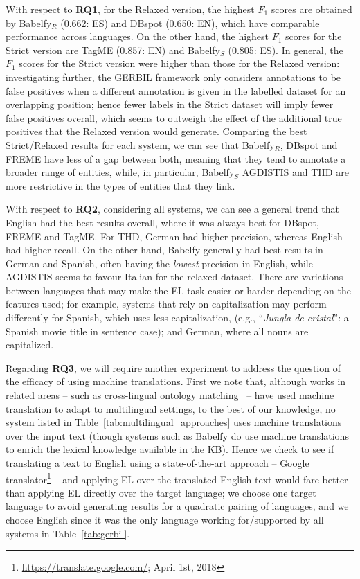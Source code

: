 \documentclass{llncs}
\begin{document}
With respect to \textbf{RQ1}, for the Relaxed version, the highest $F_1$ scores are obtained by Babelfy$_R$ (0.662: ES) and DBspot (0.650: EN), which have comparable performance across languages. On the other hand, the highest $F_1$ scores for the Strict version are TagME (0.857: EN) and Babelfy$_S$ (0.805: ES). In general, the $F_1$ scores for the Strict version were higher than those for the Relaxed version: investigating further, the GERBIL framework only considers annotations to be false positives when a different annotation is given in the labelled dataset for an overlapping position; hence fewer labels in the Strict dataset will imply fewer false positives overall, which seems to outweigh the effect of the additional true positives that the Relaxed version would generate. Comparing the best Strict/Relaxed results for each system, we can see that Babelfy$_R$, DBspot and FREME have less of a gap between both, meaning that they tend to annotate a broader range of entities, while, in particular, Babelfy$_S$ AGDISTIS and THD are more restrictive in the types of entities that they link.

With respect to \textbf{RQ2}, considering all systems, we can see a general trend that English had the best results overall, where it was always best for DBspot, FREME and TagME. For THD, German had higher precision, whereas English had higher recall. On the other hand, Babelfy generally had best results in German and Spanish, often having the \textit{lowest} precision in English, while AGDISTIS seems to favour Italian for the relaxed dataset. There are variations between languages that may make the EL task easier or harder depending on the features used; for example, systems that rely on capitalization may perform differently for Spanish, which uses less capitalization, (e.g., ``\textit{Jungla de cristal}'': a Spanish movie title in sentence case); and German, where all nouns are capitalized.
\medskip

Regarding \textbf{RQ3}, we will require another experiment to address the question of the efficacy of using machine translations. First we note that, although works in related areas -- such as cross-lingual ontology matching~\cite{fu2010} -- have used machine translation to adapt to multilingual settings, to the best of our knowledge, no system listed in Table~\ref{tab:multilingual_approaches} uses machine translations over the input text (though systems such as Babelfy do use machine translations to enrich the lexical knowledge available in the KB). Hence we check to see if translating a text to English using a state-of-the-art approach -- Google translator\footnote{\url{https://translate.google.com/}; April 1st, 2018} -- and applying EL over the translated English text would fare better than applying EL directly over the target language; we choose one target language to avoid generating results for a quadratic pairing of languages, and we choose English since it was the only language working for/supported by all systems in Table~\ref{tab:gerbil}.
\end{document}
